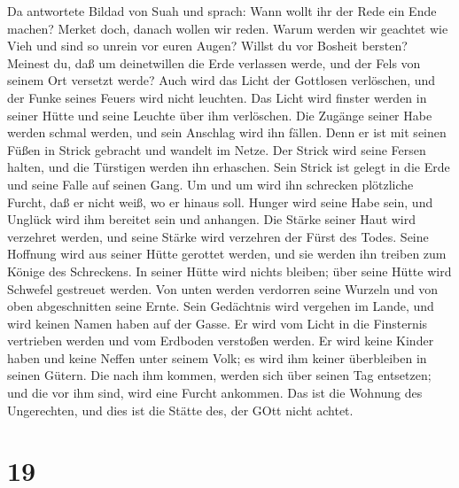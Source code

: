  Da antwortete Bildad von Suah und sprach:  Wann
wollt ihr der Rede ein Ende machen? Merket doch, danach wollen wir
reden.  Warum werden wir geachtet wie Vieh und sind so
unrein vor euren Augen?  Willst du vor Bosheit bersten?
Meinest du, daß um deinetwillen die Erde verlassen werde, und der Fels
von seinem Ort versetzt werde?  Auch wird das Licht der
Gottlosen verlöschen, und der Funke seines Feuers wird nicht leuchten.
 Das Licht wird finster werden in seiner Hütte und seine
Leuchte über ihm verlöschen.  Die Zugänge seiner Habe werden
schmal werden, und sein Anschlag wird ihn fällen.  Denn er
ist mit seinen Füßen in Strick gebracht und wandelt im Netze.
 Der Strick wird seine Fersen halten, und die Türstigen
werden ihn erhaschen.  Sein Strick ist gelegt in die Erde
und seine Falle auf seinen Gang.  Um und um wird ihn
schrecken plötzliche Furcht, daß er nicht weiß, wo er hinaus soll.
 Hunger wird seine Habe sein, und Unglück wird ihm bereitet
sein und anhangen.  Die Stärke seiner Haut wird verzehret
werden, und seine Stärke wird verzehren der Fürst des Todes.
 Seine Hoffnung wird aus seiner Hütte gerottet werden, und
sie werden ihn treiben zum Könige des Schreckens.  In
seiner Hütte wird nichts bleiben; über seine Hütte wird Schwefel
gestreuet werden.  Von unten werden verdorren seine Wurzeln
und von oben abgeschnitten seine Ernte.  Sein Gedächtnis
wird vergehen im Lande, und wird keinen Namen haben auf der Gasse.
 Er wird vom Licht in die Finsternis vertrieben werden und
vom Erdboden verstoßen werden.  Er wird keine Kinder haben
und keine Neffen unter seinem Volk; es wird ihm keiner überbleiben in
seinen Gütern.  Die nach ihm kommen, werden sich über
seinen Tag entsetzen; und die vor ihm sind, wird eine Furcht ankommen.
 Das ist die Wohnung des Ungerechten, und dies ist die
Stätte des, der GOtt nicht achtet.

\hypertarget{section-18}{%
\section{19}\label{section-18}}

